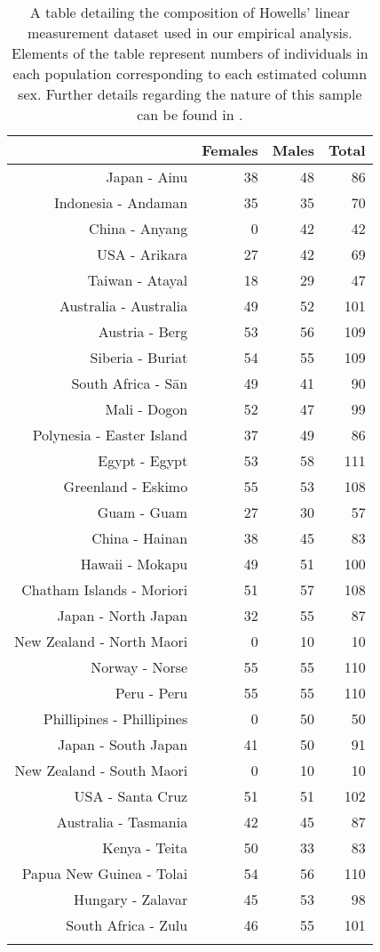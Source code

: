 \begin{longtable}{rrrr}
  \hline
 & Females & Males & Total \\ 
  \hline
Japan - Ainu &  38 &  48 &  86 \\ 
  Indonesia - Andaman &  35 &  35 &  70 \\ 
  China - Anyang &   0 &  42 &  42 \\ 
  USA - Arikara &  27 &  42 &  69 \\ 
  Taiwan - Atayal &  18 &  29 &  47 \\ 
  Australia - Australia &  49 &  52 & 101 \\ 
  Austria - Berg &  53 &  56 & 109 \\ 
  Siberia - Buriat &  54 &  55 & 109 \\ 
  South Africa - Sān &  49 &  41 &  90 \\ 
  Mali - Dogon &  52 &  47 &  99 \\ 
  Polynesia - Easter Island &  37 &  49 &  86 \\ 
  Egypt - Egypt &  53 &  58 & 111 \\ 
  Greenland - Eskimo &  55 &  53 & 108 \\ 
  Guam - Guam &  27 &  30 &  57 \\ 
  China - Hainan &  38 &  45 &  83 \\ 
  Hawaii - Mokapu &  49 &  51 & 100 \\ 
  Chatham Islands - Moriori &  51 &  57 & 108 \\ 
  Japan - North Japan &  32 &  55 &  87 \\ 
  New Zealand - North Maori &   0 &  10 &  10 \\ 
  Norway - Norse &  55 &  55 & 110 \\ 
  Peru - Peru &  55 &  55 & 110 \\ 
  Phillipines - Phillipines &   0 &  50 &  50 \\ 
  Japan - South Japan &  41 &  50 &  91 \\ 
  New Zealand - South Maori &   0 &  10 &  10 \\ 
  USA - Santa Cruz &  51 &  51 & 102 \\ 
  Australia - Tasmania &  42 &  45 &  87 \\ 
  Kenya - Teita &  50 &  33 &  83 \\ 
  Papua New Guinea - Tolai &  54 &  56 & 110 \\ 
  Hungary - Zalavar &  45 &  53 &  98 \\ 
  South Africa - Zulu &  46 &  55 & 101 \\ 
   \hline
\hline
\caption[Composition of Linear Measurement Data Used in Empirical Analysis]{A table detailing the composition of Howells' linear measurement dataset used in 
                                            our empirical analysis. Elements of the table represent numbers of individuals in each 
                                            population corresponding to each 
                                            estimated column sex. Further details regarding the nature of this sample can be found in \citep{howellsWhoWhoSkulls1995}.} 
\label{tab:howellsDataComposition}
\end{longtable}
